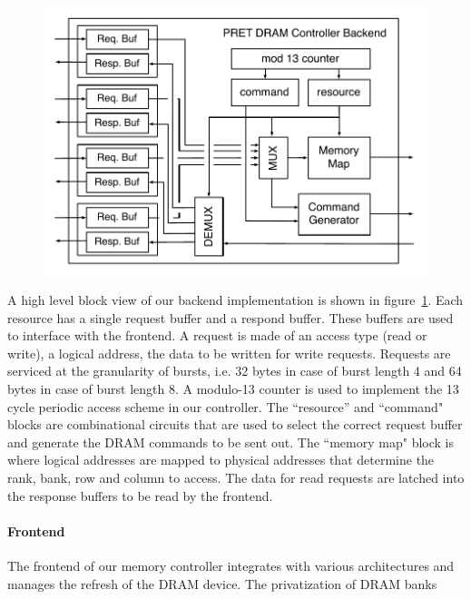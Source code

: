 \begin{figure}
\begin{center}
\includegraphics[width=1.1\linewidth]{figs/dram-backend-implementation}
\end{center}
\label{fig:dram-backend-implementation}
\end{figure}

A high level block view of our backend implementation is shown in figure~\ref{fig:dram-backend-implementation}.
Each resource has a single request buffer and a respond buffer.
These buffers are used to interface with the frontend.   
A request is made of an access type (read or write), a logical address, the data to be written for write requests. 
Requests are serviced at the granularity of bursts, i.e. 32 bytes in case of burst length 4 and 64 bytes in case of burst length 8.
A modulo-13 counter is used to implement the 13 cycle periodic access scheme in our controller.   
The ``resource'' and ``command" blocks are combinational circuits that are used to select the correct request buffer and generate the DRAM commands to be sent out. 
The ``memory map" block is where logical addresses are mapped to physical addresses that determine the rank, bank, row and column to access.
The data for read requests are latched into the response buffers to be read by the frontend.  

\paragraph{Frontend}
The frontend of our memory controller integrates with various architectures and manages the refresh of the DRAM device.
The privatization of DRAM banks    

